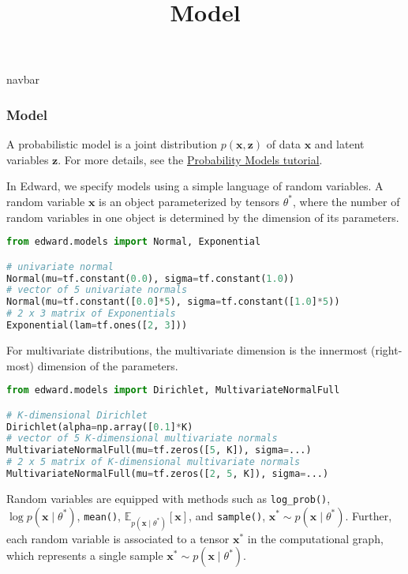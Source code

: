 \title{Model}

{{navbar}}

\subsubsection{Model}

A probabilistic model is a joint distribution $p(\mathbf{x},
\mathbf{z})$ of data $\mathbf{x}$ and latent variables $\mathbf{z}$.
For more details, see the \href{/tutorials/model}{Probability Models tutorial}.

In Edward, we specify models using a simple language of random variables.
A random variable $\mathbf{x}$ is an object parameterized by
tensors $\theta^*$, where
the number of random variables in one object is determined by
the dimension of its parameters.

\begin{lstlisting}[language=Python]
from edward.models import Normal, Exponential

# univariate normal
Normal(mu=tf.constant(0.0), sigma=tf.constant(1.0))
# vector of 5 univariate normals
Normal(mu=tf.constant([0.0]*5), sigma=tf.constant([1.0]*5))
# 2 x 3 matrix of Exponentials
Exponential(lam=tf.ones([2, 3]))
\end{lstlisting}

For multivariate distributions, the multivariate dimension is the
innermost (right-most) dimension of the parameters.

\begin{lstlisting}[language=Python]
from edward.models import Dirichlet, MultivariateNormalFull

# K-dimensional Dirichlet
Dirichlet(alpha=np.array([0.1]*K)
# vector of 5 K-dimensional multivariate normals
MultivariateNormalFull(mu=tf.zeros([5, K]), sigma=...)
# 2 x 5 matrix of K-dimensional multivariate normals
MultivariateNormalFull(mu=tf.zeros([2, 5, K]), sigma=...)
\end{lstlisting}

Random variables are equipped with methods such as
\texttt{log_prob()}, $\log p(\mathbf{x}\mid\theta^*)$,
\texttt{mean()}, $\mathbb{E}_{p(\mathbf{x}\mid\theta^*)}[\mathbf{x}]$,
and \texttt{sample()}, $\mathbf{x}^*\sim p(\mathbf{x}\mid\theta^*)$.
Further, each random variable is associated to a tensor $\mathbf{x}^*$ in the
computational graph, which represents a single sample $\mathbf{x}^*\sim
p(\mathbf{x}\mid\theta^*)$.


